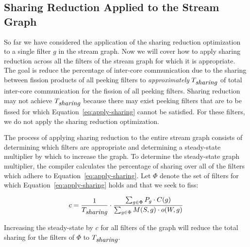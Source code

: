 \subsection{Sharing Reduction Applied to the Stream Graph}
So far we have considered the application of the sharing reduction
optimization to a single filter $g$ in the stream graph.  Now we will
cover how to apply sharing reduction across all the filters of the
stream graph for which it is appropriate.  The goal is reduce the
percentage of inter-core communication due to the sharing between
fission products of all peeking filters to {\it approximately}
$T_{\mbox{\it sharing}}$ of total inter-core communication for the fission
of all peeking filters.  Sharing reduction may not achieve
$T_{\mbox{\it sharing}}$ because there may exist peeking filters that are to
be fissed for which Equation~\ref{eq:apply-sharing} cannot be
satisfied.  For these filters, we do not apply the sharing reduction
optimization.

The process of applying sharing reduction to the entire stream graph
consists of determining which filters are appropriate and determining
a steady-state multiplier by which to increase the graph.  To
determine the steady-state graph multiplier, the compiler calculates
the percentage of sharing over all of the filters which adhere to
Equation~\ref{eq:apply-sharing}.  Let $\Phi$ denote the set of filters
for which Equation~\ref{eq:apply-sharing} holds and that we seek to
fiss:

\begin{equation}
\label{eq:sr-mult}
c = \frac{1}{T_{\mt{sharing}}} \cdot \frac{\sum_{g \in \Phi} P_g \cdot C(g) }{\sum _{g \in
    \Phi} M(S, g) \cdot o(W, g)}
\end{equation}

\noindent Increasing the steady-state by $c$ for all filters of the
graph will reduce the total sharing for the filters of $\Phi$ to
$T_{\mbox{\it sharing}}$.  








